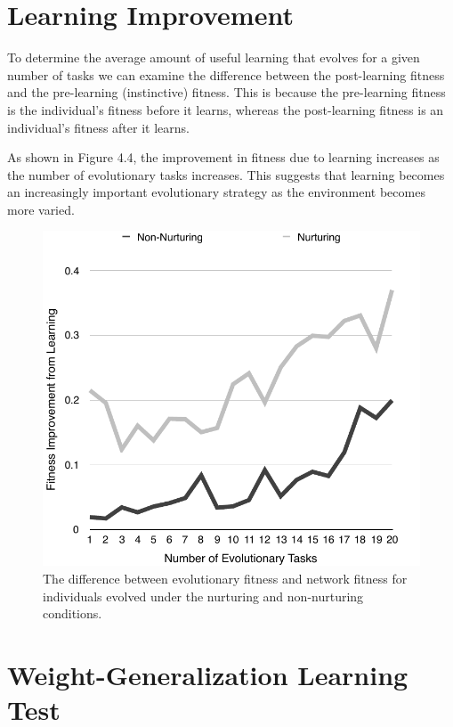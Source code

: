 \documentclass[master]{outhesis}
\begin{document}
\section{Learning Improvement}

To determine the average amount of useful learning that evolves for a given number of tasks we can examine the difference between the post-learning fitness and the pre-learning (instinctive) fitness.
This is because the pre-learning fitness is the individual's fitness before it learns, whereas the post-learning fitness is an individual's fitness after it learns.

As shown in Figure 4.4, the improvement in fitness due to learning increases as the number of evolutionary tasks increases. This suggests that learning becomes an increasingly important evolutionary strategy as the environment becomes more varied.

\begin{figure}[H]
	\centering
	\includegraphics{LearningImprovementPlot.pdf}
	\caption{The difference between evolutionary fitness and network fitness for individuals evolved under the nurturing and non-nurturing conditions.}
\end{figure}

\section{Weight-Generalization Learning Test}
\end{document}
